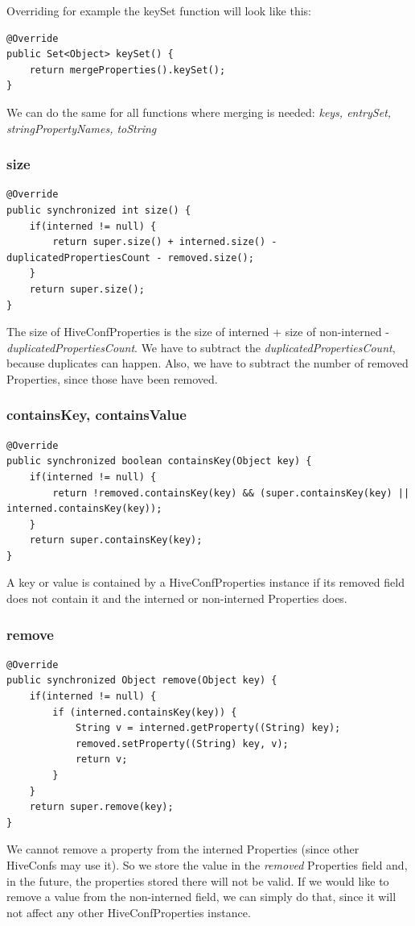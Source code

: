 \noindent Overriding for example the keySet function will look like this:
\begin{lstlisting}
@Override
public Set<Object> keySet() {
	return mergeProperties().keySet();
}
\end{lstlisting}

We can do the same for all functions where merging is needed: \textit{keys, entrySet, stringPropertyNames, toString \etc}

\subsubsection{size}
\begin{lstlisting}
@Override
public synchronized int size() {
	if(interned != null) {
		return super.size() + interned.size() - duplicatedPropertiesCount - removed.size();
	}
	return super.size();
}
\end{lstlisting}
The size of HiveConfProperties is the size of interned + size of non-interned - \textit{duplicatedPropertiesCount}. We have to subtract the \textit{duplicatedPropertiesCount}, because duplicates can happen. Also, we have to subtract the number of removed Properties, since those have been removed.

\subsubsection{containsKey, containsValue}
\begin{lstlisting}
@Override
public synchronized boolean containsKey(Object key) {
	if(interned != null) {
		return !removed.containsKey(key) && (super.containsKey(key) || interned.containsKey(key));
	}
	return super.containsKey(key);
}
\end{lstlisting}
A key or value is contained by a HiveConfProperties instance if its removed field does not contain it and the interned or non-interned Properties does.

\subsubsection{remove}
\begin{lstlisting}
@Override
public synchronized Object remove(Object key) {
	if(interned != null) {
		if (interned.containsKey(key)) {	
			String v = interned.getProperty((String) key);
			removed.setProperty((String) key, v);
			return v;
		}
	}
	return super.remove(key);
}
\end{lstlisting}
We cannot remove a property from the interned Properties (since other HiveConfs may use it). So we store the value in the \textit{removed} Properties field and, in the future, the properties stored there will not be valid. If we would like to remove a value from the non-interned field, we can simply do that, since it will not affect any other HiveConfProperties instance.

